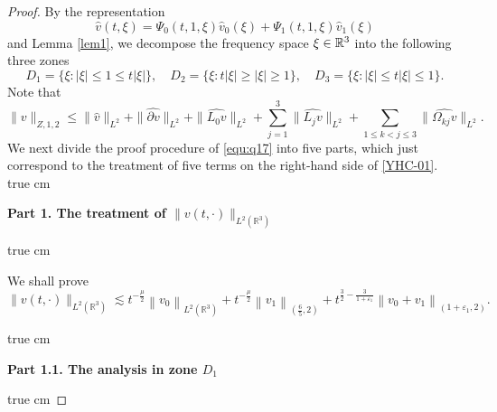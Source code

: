 \documentclass[10pt,a4paper]{amsart}
\newcommand{\R}{\mathbb R}
\newcommand{\f}{\frac}
\newcommand{\p}{\partial}
\begin{document}
\begin{proof}
By the representation
\begin{equation}\label{formula}
\hat{v}(t, \xi)=\Psi_{0}(t, 1, \xi) \hat{v}_{0}(\xi)+\Psi_{1}(t, 1, \xi) \hat{v}_{1}(\xi)
\end{equation}
and Lemma \ref{lem1}, we decompose the frequency space $\xi\in\Bbb R^3$ into the following three zones
\begin{equation}\label{equ:q19}
D_1=\{\xi: |\xi| \leq 1 \leq t|\xi|\}, \quad D_2=\{\xi: t|\xi|\geq|\xi|\ge 1\}, \quad D_3=\{\xi: |\xi|\leq t|\xi| \leq 1\}.
\end{equation}
Note that
\begin{equation}\label{YHC-01}
\|v\|_{Z, 1, 2} \leq \|\hat{v}\|_{L^2}+\|\hat{\p v}\|_{L^2}+\|\widehat{L_0v}\|_{L^2}
+\sum_{j=1}^3\|\widehat{L_jv}\|_{L^2}+\sum_{1\leq k<j\leq3}\|\widehat{\Omega_{kj}v}\|_{L^2}.
\end{equation}
We next divide the proof procedure of \eqref{equ:q17} into five parts, which just correspond to the treatment of five terms
on the right-hand side of \eqref{YHC-01}.
 true cm

{\bf Part 1.  The treatment  of $\|v(t, \cdot)\|_{L^2(\R^3)}$ }

 true cm

We shall prove
\begin{equation}\label{equ:q18}
\|v(t, \cdot)\|_{L^2(\R^3)} \lesssim t^{-\f{\mu}{2}}\left\|v_0\right\|_{L^2(\R^3)}
+t^{-\f{\mu}{2}}\left\|v_1\right\|_{(\f{6}{5}, 2)}
+t^{\f{3}{2}-\f{3}{1+\varepsilon_1}}\left\|v_0+v_1\right\|_{(1+\varepsilon_1, 2)}.
\end{equation}

 true cm

{\bf Part 1.1.  The analysis  in zone $D_1$}

 true cm



\end{proof}
\end{document}
